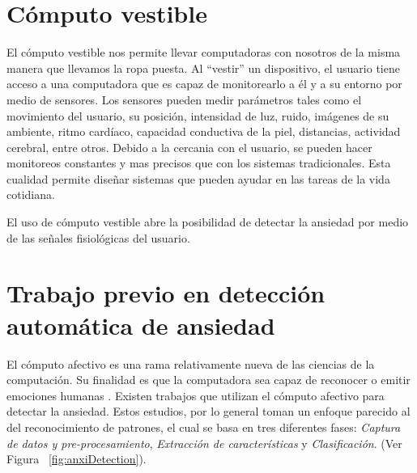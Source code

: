 \section{C\'omputo vestible}\label{secc:dementia}
El c\'omputo vestible nos permite llevar computadoras con nosotros de la misma manera que llevamos la ropa puesta. Al ``vestir'' un dispositivo, el usuario tiene acceso a una computadora que es capaz de monitorearlo a \'el y a su entorno por medio de sensores. Los sensores pueden medir par\'ametros tales como el movimiento del usuario, su posici\'on, intensidad de luz, ruido, im\'agenes de su ambiente, ritmo card\'iaco, capacidad conductiva de la piel, distancias, actividad cerebral, entre otros. Debido a la cercania con el usuario, se pueden hacer monitoreos constantes y mas precisos que con los sistemas tradicionales. Esta cualidad permite dise\~nar sistemas que pueden ayudar en las tareas de la vida cotidiana.

El uso de c\'omputo vestible abre la posibilidad de detectar la ansiedad por medio de las se\~nales fisiol\'ogicas del usuario.

\section{Trabajo previo en detecci\'on autom\'atica de ansiedad}
El c\'omputo afectivo es una rama relativamente nueva de las ciencias de la computaci\'on. Su finalidad es que la computadora sea capaz de reconocer o emitir emociones humanas \citep{picard1997affective}. Existen trabajos que utilizan el c\'omputo afectivo para detectar la ansiedad. Estos estudios, por lo general toman un enfoque parecido al del reconocimiento de patrones, el cual se basa en tres diferentes fases: \textit{Captura de datos y pre-procesamiento}, \textit{Extracci\'on de caracter\'isticas} y \textit{Clasificaci\'on}. (Ver Figura ~\ref{fig:anxiDetection}). 

